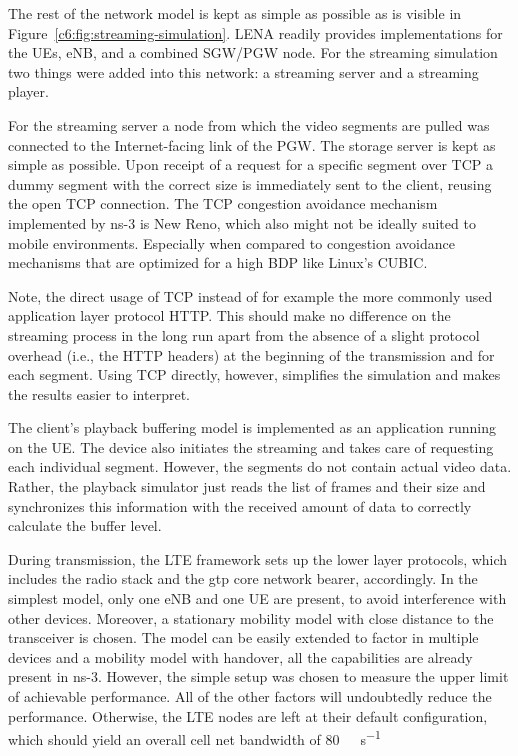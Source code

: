 The rest of the network model is kept as simple as possible as is visible in Figure~\ref{c6:fig:streaming-simulation}. LENA readily provides implementations for the \glspl{UE}, \gls{eNB}, and a combined \gls{SGW}/\gls{PGW} node. For the streaming simulation two things were added into this network: a streaming server and a streaming player.

For the streaming server a node from which the video segments are pulled was connected to the Internet-facing link of the \gls{PGW}. The storage server is kept as simple as possible. Upon receipt of a request for a specific segment over \gls{TCP} a dummy segment with the correct size is immediately sent to the client, reusing the open \gls{TCP} connection. %
The \gls{TCP} congestion avoidance mechanism implemented by ns-3 is New Reno, which also might not be ideally suited to mobile environments. Especially when compared to congestion avoidance mechanisms that are optimized for a high \gls{BDP} like Linux's CUBIC.

Note, the direct usage of \gls{TCP} instead of for example the more commonly used application layer protocol \gls{HTTP}. This should make no difference on the streaming process in the long run apart from the absence of a slight protocol overhead (i.e., the \gls{HTTP} headers) at the beginning of the transmission and for each segment. Using \gls{TCP} directly, however, simplifies the simulation and makes the results easier to interpret.

The client's playback buffering model is implemented as an application running on the \gls{UE}. The device also initiates the streaming and takes care of requesting each individual segment. However, the segments do not contain actual video data. Rather, the playback simulator just reads the list of frames and their size and synchronizes this information with the received amount of data to correctly calculate the buffer level.

During transmission, the \gls{LTE} framework sets up the lower layer protocols, which includes the radio stack and the \gls{gtp} core network bearer, accordingly. In the simplest model, only one \gls{eNB} and one \gls{UE} are present, to avoid interference with other devices. Moreover, a stationary mobility model with close distance to the transceiver is chosen. The model can be easily extended to factor in multiple devices and a mobility model with handover, all the capabilities are already present in ns-3. However, the simple setup was chosen to measure the upper limit of achievable performance. All of the other factors will undoubtedly reduce the performance. Otherwise, the \gls{LTE} nodes are left at their default configuration, which should yield an overall cell net bandwidth of \SI{80}{\mega\bit\per\second}

